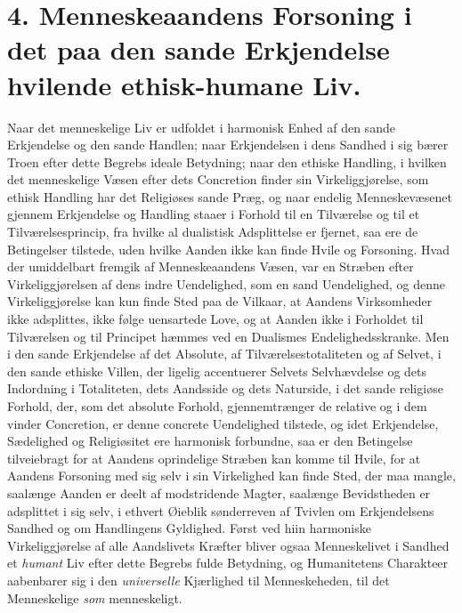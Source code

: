 \section*{4. Menneskeaandens Forsoning i det paa den sande Erkjendelse hvilende ethisk-humane Liv.}

Naar det menneskelige Liv er udfoldet i harmonisk Enhed af den sande Erkjendelse
og den sande Handlen; naar Erkjendelsen i dens Sandhed i sig bærer Troen efter
dette Begrebs ideale Betydning; naar den ethiske Handling, i hvilken det
menneskelige Væsen efter dets Concretion finder sin Virkeliggjørelse, som ethisk
Handling har det Religiøses sande Præg, og naar endelig Menneskevæsenet gjennem
Erkjendelse og Handling staaer i Forhold til en Tilværelse og til et
Tilværelsesprincip, fra hvilke al dualistisk Adsplittelse er fjernet, saa ere de
Betingelser tilstede, uden hvilke Aanden ikke kan finde Hvile og Forsoning. Hvad
der umiddelbart fremgik af Menneskeaandens Væsen, var en Stræben efter
Virkeliggjørelsen af dens indre Uendelighed, som en
 sand Uendelighed, og denne Virkeliggjørelse kan kun finde Sted paa de Vilkaar, at
Aandens Virksomheder ikke adsplittes, ikke følge uensartede Love, og at Aanden
ikke i Forholdet til Tilværelsen og til Principet hæmmes ved en Dualismes
Endelighedsskranke. Men i den sande Erkjendelse af det Absolute, af
Tilværelsestotaliteten og af Selvet, i den sande ethiske Villen, der ligelig
accentuerer Selvets Selvhævdelse og dets Indordning i Totaliteten, dets Aandsside
og dets Naturside, i det sande religiøse Forhold, der, som det absolute Forhold,
gjennemtrænger de relative og i dem vinder Concretion, er denne concrete
Uendelighed tilstede, og idet Erkjendelse, Sædelighed og Religiøsitet ere
harmonisk forbundne, saa er den Betingelse tilveiebragt for at Aandens
oprindelige Stræben kan komme til Hvile, for at Aandens Forsoning med sig selv i
sin Virkelighed kan finde Sted, der maa mangle, saalænge Aanden er deelt af
modstridende Magter, saalænge Bevidstheden er adsplittet i sig selv, i ethvert
Øieblik sønderreven af Tvivlen om Erkjendelsens Sandhed og om Handlingens
Gyldighed. Først ved hiin harmoniske Virkeliggjørelse af alle Aandslivets Kræfter
bliver ogsaa Menneskelivet i Sandhed et \emph{humant} Liv efter dette Begrebs
fulde Betydning, og Humanitetens Charakteer aabenbarer sig i den
\emph{universelle} Kjærlighed til Menneskeheden, til det Menneskelige \emph{som}
menneskeligt.

